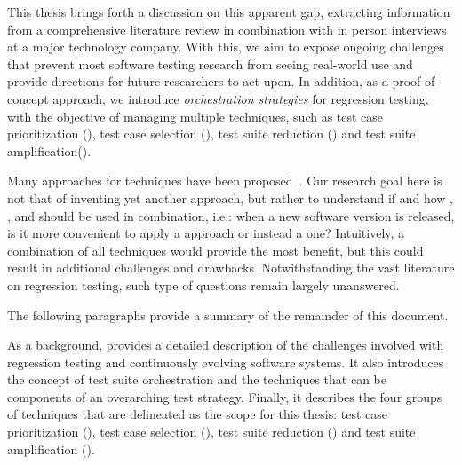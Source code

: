 
This thesis brings forth a discussion on this apparent gap, extracting information from a comprehensive literature review in combination with in person interviews at a major technology company.
With this, we aim to expose ongoing challenges that prevent most software testing research from seeing real-world use and provide directions for future researchers to act upon.
In addition, as a proof-of-concept approach, we introduce \textit{orchestration strategies} for regression testing, with the objective of managing multiple \rt techniques, such as test case prioritization (\tcp), test case selection (\tcs), test suite reduction (\tsr) and test suite amplification(\tsa).

Many approaches for \rt techniques have been proposed~\cite{soetens2016change,legunsen2016,henard2016,luo2018static}.
Our research goal here is not that of inventing yet another approach, but rather to understand if and how \tcs, \tcp, \tsr and \tsa should be used in combination, i.e.:
when a new software version is released, is it more convenient to apply a \tcs approach or instead a \tcp one?
Intuitively, a combination of all techniques would provide the most benefit, but this could result in additional challenges and drawbacks.
Notwithstanding the vast literature on regression testing, such type of questions remain largely unanswered.

The following paragraphs provide a summary of the remainder of this document.

As a background,  provides a detailed description of the challenges involved with regression testing and continuously evolving software systems.
It also introduces the concept of test suite orchestration and the techniques that can be components of an overarching test strategy.
Finally, it describes the four groups of techniques that are delineated as the scope for this thesis: test case prioritization (\tcp), test case selection (\tcs), test suite reduction (\tsr) and test suite amplification (\tsa).

